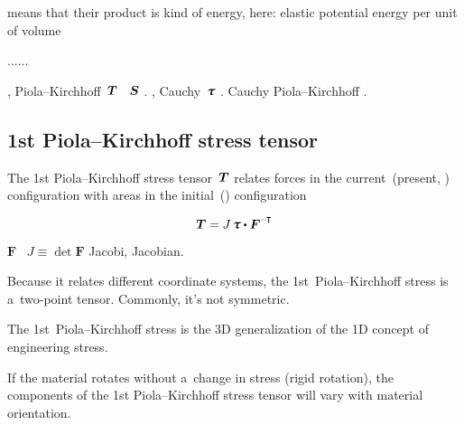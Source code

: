  means that their product is kind of energy, here: elastic potential energy per unit of volume

......

, Piola\hbox{--}Kirchhoff~${\bm{T}}$ ~${\bm{S}}$   .
, Cauchy~${\cauchystress}$   .
\en{,} Cauchy Piola\hbox{--}Kirchhoff .

\subsection*{1st Piola\hbox{--}Kirchhoff stress tensor}

The 1st Piola\hbox{--}Kirchhoff stress tensor~$\bm{T}$ relates forces in the current~(present, ) configuration with areas in the initial~() configuration

\noindent\vspace{-0.2em}\begin{equation*}
\firstpiolakirchhoffstress = J \, \cauchystress \dotp \bm{F}^{\expminusT}
\end{equation*}

\vspace{-0.2em}\noindent
{} $\bm{F}$   ~${J \equiv \operatorname{det} \bm{F}}$  Jacobi, Jacobian.

Because it relates different coordinate systems, the 1st~Piola\hbox{--}Kirchhoff stress is a~two\hbox{-}point tensor.
Commonly, it’s not symmetric.

The 1st~Piola\hbox{--}Kirchhoff stress is the 3D generalization of the 1D concept of engineering stress.

If the material rotates without a~change in stress (rigid rotation), the components of the 1st Piola\hbox{--}Kirchhoff stress tensor will vary with material orientation.

